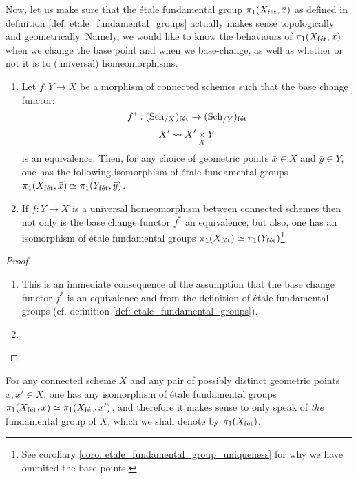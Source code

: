        Now, let us make sure that the \'etale fundamental group $\pi_1(X_{\mathrm{f\acute{e}t}}, \bar{x})$ as defined in definition \ref{def: etale_fundamental_groups} actually makes sense topologically and geometrically. Namely, we would like to know the behaviours of $\pi_1(X_{\mathrm{f\acute{e}t}}, \bar{x})$ when we change the base point and when we base-change, as well as whether or not it is  to (universal) homeomorphisms.
        \begin{proposition} \label{prop: the_etale_fundamental_group_as_a_topological_invariance}
            \noindent
            \begin{enumerate}
                \item Let $f: Y \to X$ be a morphism of connected schemes such that the base change functor:
                    $$f^*: (\mathrm{Sch}_{/X})_{\mathrm{f\acute{e}t}} \to (\mathrm{Sch}_{/Y})_{\mathrm{f\acute{e}t}}$$
                    $$X' \mapsto X' \x_X Y$$
                is an equivalence. Then, for any choice of geometric points $\bar{x} \in X$ and $\bar{y} \in Y$, one has the following isomorphism of \'etale fundamental groups $\pi_1(X_{\mathrm{f\acute{e}t}}, \bar{x}) \simeq \pi_1(Y_{\mathrm{f\acute{e}t}}, \bar{y})$.
                \item If $f: Y \to X$ is a \href{https://stacks.math.columbia.edu/tag/04DC}{\underline{universal homeomorphism}} between connected schemes then not only is the base change functor $f^*$ an equivalence, but also, one has an isomorphism of \'etale fundamental groups $\pi_1(X_{\mathrm{f\acute{e}t}}) \simeq \pi_1(Y_{\mathrm{f\acute{e}t}})$\footnote{See corollary \ref{coro: etale_fundamental_group_uniqueness} for why we have ommited the base points.}. 
            \end{enumerate}
        \end{proposition}
            \begin{proof}
                \noindent
                \begin{enumerate}
                    \item This is an immediate consequence of the assumption that the base change functor $f^*$ is an equivalence and from the definition of \'etale fundamental groups (cf. definition \ref{def: etale_fundamental_groups}).
                    \item 
                \end{enumerate}
            \end{proof}
        \begin{corollary} \label{coro: etale_fundamental_group_uniqueness}
            For any connected scheme $X$ and any pair of possibly distinct geometric points $\bar{x}, \bar{x}' \in X$, one has any isomorphism of \'etale fundamental groups $\pi_1(X_{\mathrm{f\acute{e}t}}, \bar{x}) \simeq \pi_1(X_{\mathrm{f\acute{e}t}}, \bar{x}')$, and therefore it makes sense to only speak of \textit{the} fundamental group of $X$, which we shall denote by $\pi_1(X_{\mathrm{f\acute{e}t}})$.
        \end{corollary}
        
